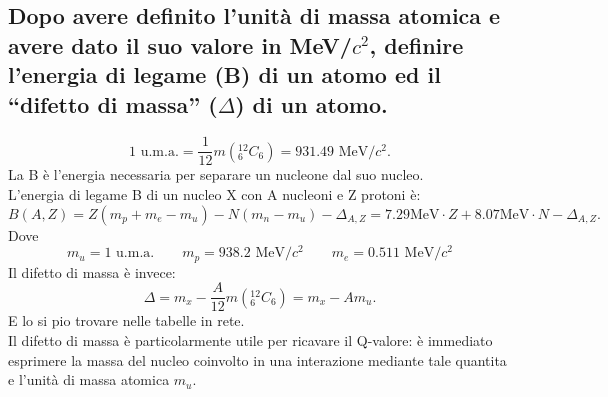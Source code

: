 \subsection[$\ $ Unità di massa atomica, energia di legame B e difetto di massa $\Delta$]{Dopo avere definito l’unità di massa atomica e avere dato il suo valore in MeV/$c^2$, definire l’energia di legame (B) di un atomo ed il “difetto di massa” ($\Delta$) di un atomo.}
\[
	\text{1 u.m.a.} = \frac{1}{12}m\left( {}^{12}_{6}C_{6} \right) = 931.49 \text{ MeV/}c^2 
.\]
La B è l'energia necessaria per separare un nucleone dal suo nucleo.\\
L'energia di legame B di un nucleo X con A nucleoni e Z protoni è:
\[
	B\left( A, Z \right) = Z\left( m_p + m_e - m_u \right) - N \left( m_n - m_u \right) - \Delta_{A, Z} = 7.29 \text{MeV} \cdot Z + 8.07 \text{MeV} \cdot N - \Delta_{A,Z} 
.\] 
Dove 
\[
	m_u = 1 \text{ u.m.a.}\quad \quad 
	m_p = 938.2 \text{ MeV/}c^2\quad \quad 
	m_e = 0.511 \text{ MeV/}c^2
\]
Il difetto di massa è invece:
\[
	\Delta = m_{x} - \frac{A}{12}m\left( {}^{12}_{6}C_{6} \right) = m_x - Am_u 
.\] 
E lo si pio trovare nelle tabelle in rete.\\
Il difetto di massa è particolarmente utile per ricavare il Q-valore: è immediato esprimere la massa del nucleo coinvolto in una interazione mediante tale quantita e l'unità di massa atomica $m_u$.

